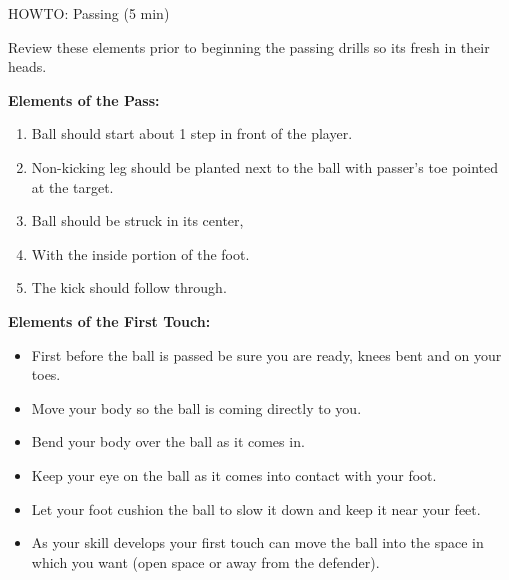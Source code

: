 \begin{evenBlock}{HOWTO:  Passing (5 min)}

\begin{minipage}[t]{\linewidth}
    \centering
    Review these elements prior to beginning the passing drills so its fresh in their heads.

    
        \textbf{Elements of the Pass:}
    
        \begin{enumerate}
        \setlength{\itemsep}{0pt}
        \setlength{\parskip}{0pt}
        \setlength{\parsep}{0pt}
        \item Ball should start about 1 step in front of the player.
        \item Non-kicking leg should be planted next to the ball with passer's toe pointed at the target.
        \item Ball should be struck in its center,
        \item With the inside portion of the foot.
        \item The kick should follow through.
        \end{enumerate}
        
        \textbf{Elements of the First Touch:}
        \begin{itemize}
        \setlength{\itemsep}{0pt}
        \setlength{\parskip}{0pt}
        \setlength{\parsep}{0pt}
        \item First before the ball is passed be sure you are ready, knees bent and on your toes.
        \item Move your body so the ball is coming directly to you.
        \item Bend your body over the ball as it comes in.
        \item Keep your eye on the ball as it comes into contact with your foot.
        \item Let your foot cushion the ball to slow it down and keep it near your feet.
        \item As your skill develops your first touch can move the ball into the space in which you want (open space or away from the defender).
        \end{itemize}

\end{minipage}

\end{evenBlock}